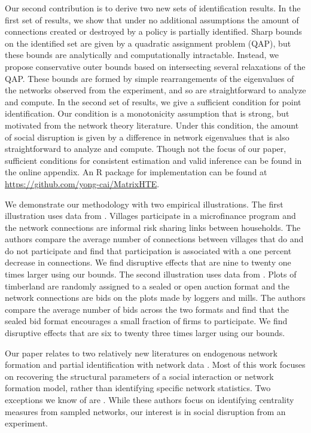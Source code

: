 \documentclass[12pt]{article}
\theoremstyle{definition}
\begin{document}
Our second contribution is to derive two new sets of identification results. In the first set of results, we show that under no additional assumptions the amount of connections created or destroyed by a policy is partially identified. Sharp bounds on the identified set are given by a quadratic assignment problem (QAP), but these bounds are analytically and computationally intractable. Instead, we propose conservative outer bounds based on intersecting several relaxations of the QAP. These bounds are formed by simple rearrangements of the eigenvalues of the networks observed from the experiment, and so are straightforward to analyze and compute. In the second set of results, we give a sufficient condition for point identification. Our condition is a monotonicity assumption that is strong, but motivated from the network theory literature. Under this condition, the amount of social disruption is given by a difference in network eigenvalues that is also straightforward to analyze and compute. Though not the focus of our paper, sufficient conditions for consistent estimation and valid inference can be found in the online appendix. An R package for implementation can be found at \url{https://github.com/yong-cai/MatrixHTE}.   

We demonstrate our methodology with two empirical illustrations. The first illustration uses data from \cite{banerjee2021changes}. Villages participate in a microfinance program and the network connections are informal risk sharing links between households. The authors compare the average number of connections between villages that do and do not participate and find that participation is associated with a one percent decrease in connections. We find disruptive effects that are nine to twenty one times larger using our bounds. The second illustration uses data from \cite{athey2011comparing}. Plots of timberland are randomly assigned to a sealed or open auction format and the network connections are bids on the plots made by loggers and mills. The authors compare the average number of bids across the two formats and find that the sealed bid format encourages a small fraction of firms to participate. We find disruptive effects that are six to twenty three times larger using our bounds.   

Our paper relates to two relatively new literatures on endogenous network formation and partial identification with network data \cite[see, generally, reviews by][]{bramoulle2020peer,graham2020network,molinari2020microeconometrics}. Most of this work focuses on recovering the structural parameters of a social interaction or network formation model, rather than identifying specific network statistics. Two exceptions we know of are \cite{chandrasekhar2011econometrics,thirkettle2019identification}. While these authors focus on identifying centrality measures from sampled networks, our interest is in social disruption from an experiment.   
\end{document}
